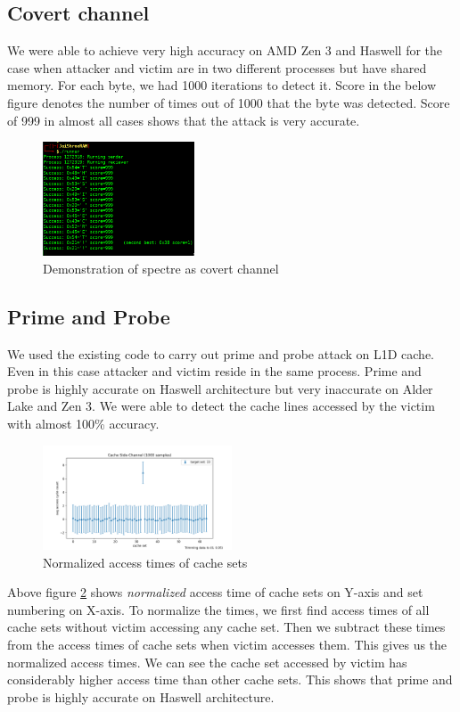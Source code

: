 \subsection{Covert channel}
We were able to achieve very high accuracy on AMD Zen 3 and Haswell for the case when attacker and victim are in two different processes but have shared memory. For each byte, we had 1000 iterations to detect it. Score in the below figure denotes the number of times out of 1000 that the byte was detected. Score of 999 in almost all cases shows that the attack is very accurate.
\begin{figure}[H]
    \centering
    \includegraphics[width=0.4\textwidth]{images/shared-spectre.png}
    \caption{Demonstration of spectre as covert channel}
    \label{covert}
\end{figure}

\subsection{Prime and Probe}
We used the existing code to carry out prime and probe attack on L1D cache. Even in this case attacker and victim reside in the same process. Prime and probe is highly accurate on Haswell architecture but very inaccurate on Alder Lake and Zen 3. We were able to detect the cache lines accessed by the victim with almost 100\% accuracy.
\begin{figure}[H]
    \centering
    \includegraphics[width=0.5\textwidth]{images/primeprobe.png}
    \caption{Normalized access times of cache sets}
    \label{primeprobe}
\end{figure}
\indent Above figure \ref{primeprobe} shows \textit{normalized} access time of cache sets on Y-axis and set numbering on X-axis. To normalize the times, we first find access times of all cache sets without victim accessing any cache set. Then we subtract these times from the access times of cache sets when victim accesses them. This gives us the normalized access times. We can see the cache set accessed by victim has considerably higher access time than other cache sets. This shows that prime and probe is highly accurate on Haswell architecture.

